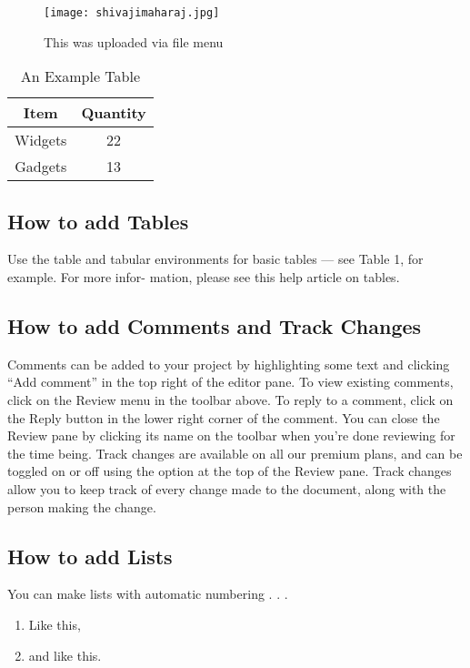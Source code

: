 \documentclass{article}
\begin{document}
\begin{figure}
	\centering
	\texttt{[image: shivajimaharaj.jpg]}
	\caption{This  was uploaded via file menu}
	
\end{figure}
\begin{table}
	\centering
	\begin{tabular}{c|c}
		\hline
		Item & Quantity\\
		\hline
		Widgets & 22\\
		Gadgets & 13\\
			\end{tabular}
		
		\caption{An Example Table}
		\label{fig:tab}
		
		
		
	
\end{table}

\subsection{How to add Tables}
Use the table and tabular environments for basic tables — see Table 1, for example. For more infor-
mation, please see this help article on tables.

\subsection{How to add Comments and Track Changes}
Comments can be added to your project by highlighting some text and clicking “Add comment” in
the top right of the editor pane. To view existing comments, click on the Review menu in the toolbar
above. To reply to a comment, click on the Reply button in the lower right corner of the comment.
You can close the Review pane by clicking its name on the toolbar when you’re done reviewing for the
time being.
Track changes are available on all our premium plans, and can be toggled on or off using the option
at the top of the Review pane. Track changes allow you to keep track of every change made to the
document, along with the person making the change.

\subsection{How to add Lists}
You can make lists with automatic numbering . . .\newline
\begin{enumerate}
	\item  Like this,
	\item and like this.
	\end{enumerate}
\end{document}
